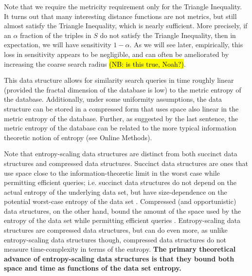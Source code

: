 \documentclass[review,preprint,12pt]{elsarticle}
\renewcommand{\cite}{\citep} %
\theoremstyle{definition}
\theoremstyle{remark}
\numberwithin{equation}{section}
\begin{document}
Note that we require the metricity requirement only for the Triangle Inequality.
It turns out that many interesting distance functions are not metrics, but still almost satisfy the Triangle Inequality, which is nearly sufficient.
More precisely, if an $\alpha$ fraction of the triples in $S$ do not satisfy the Triangle Inequality, then in expectation, we will have sensitivity $1 - \alpha$.
As we will see later, empirically, this loss in sensitivity appears to be negligible, and can often be ameliorated by increasing the coarse search radius \hl{(NB: is this true, Noah?)}.

This data structure allows for similarity search queries in time roughly linear (provided the fractal dimension of the database is low) to the metric entropy of the database.
Additionally, under some uniformity assumptions, the data structure can be stored in a compressed form that uses space also linear in the metric entropy of the database.
Further, as suggested by the last sentence, the metric entropy of the database can be related to the more typical information theoretic notion of entropy (see Online Methods).

Note that entropy-scaling data structures are distinct from both succinct data structures and compressed data structures.
Succinct data structures are ones that use space close to the information-theoretic limit in the worst case while permitting efficient queries; i.e.
succinct data structures do not depend on the actual entropy of the underlying data set, but have size-dependence on the potential worst-case entropy of the data set \cite{jacobson1988succinct}.
Compressed (and opportunistic) data structures, on the other hand, bound the amount of the space used by the entropy of the data set while permitting efficient queries \cite{grossi2005compressed, ferragina2000opportunistic}.
Entropy-scaling data structures are compressed data structures, but can do even more, as
unlike entropy-scaling data structures though, compressed data structures do not measure time-complexity in terms of the entropy.
\textbf{The primary theoretical advance of entropy-scaling data structures is that they bound both space and time as functions of the data set entropy.}
\end{document}
